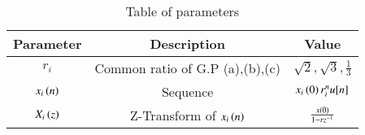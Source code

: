 \begin{table}[ht]
\renewcommand\thetable{1}
\begin{tabular}{|c|c|c|}
    \hline 
    \textbf{Parameter}&\textbf{Description} &\textbf{Value}\\
    \hline 
    $r_i$ & Common ratio of G.P (a),(b),(c) & $\sqrt{2}, \sqrt{3}, \frac{1}{3}$ \\
    \hline 
    $x_i\left(n\right)$ & Sequence & $x_i\left(0\right)r_i^nu[n]$ \\
    \hline 
	$X_i\left(z\right)$ & Z-Transform of $x_i\left(n\right)$ & $\frac{x\left(0\right)}{1-rz^{-1}}$ \\
    \hline
\end{tabular}

\caption{Table of parameters}
\label{Table:1}
\end{table}
